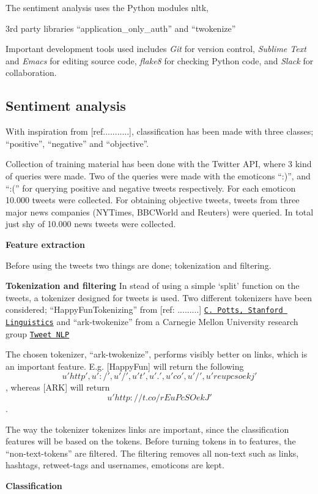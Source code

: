 \documentclass[Main]{subfiles}
\begin{document}



The sentiment analysis uses the Python modules nltk, 

3rd party libraries ``application\_only\_auth'' and ``twokenize''

Important development tools used includes \textit{Git} for version control, \textit{Sublime Text} and \textit{Emacs} for editing source code, \textit{flake8} for checking Python code, and \textit{Slack} for collaboration.




\subsection{Sentiment analysis}


With inspiration from [ref...........], classification has been made with three classes; ``positive'', ``negative'' and ``objective''.

Collection of training material has been done with the Twitter API, where 3 kind of queries were made. Two of the queries were made with the emoticons ``:)'', and ``:('' for querying positive and negative tweets respectively. For each emoticon 10.000 tweets were collected. For obtaining objective tweets, tweets from three major news companies (NYTimes, BBCWorld and Reuters) were queried. In total just shy of 10.000 news tweets were collected. 

\textbf{Feature extraction}

Before using the tweets two things are done; tokenization and filtering.

\textbf{Tokenization and filtering}
In stead of using a simple `split' function on the tweets, a tokenizer designed for tweets is used. Two different tokenizers have been considered; ``HappyFunTokenizing'' from [ref: .........] \href{http://sentiment.christopherpotts.net/tokenizing.html}{\tt C. Potts, Stanford Linguistics} and ``ark-twokenize'' from a Carnegie Mellon University research group \href{http://www.ark.cs.cmu.edu/TweetNLP/}{\tt Tweet NLP}

The chosen tokenizer, ``ark-twokenize'', performs visibly better on links, which is an important feature. E.g. [HappyFun] will return the following 
\[u'http', u':/', u'/', u't', u'.', u'co', u'/', u'reupcsoekj'\], whereas [ARK] will return \[u'http://t.co/rEuPcSOekJ'\].

The way the tokenizer tokenizes links are important, since the classification features will be based on the tokens. Before turning tokens in to features, the ``non-text-tokens'' are filtered. The filtering removes all non-text such as links, hashtags, retweet-tags and usernames, emoticons are kept. 



\textbf{Classification}
 
\end{document}
